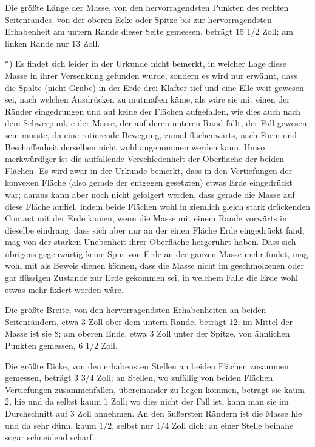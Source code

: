 \documentclass[a4paper, 11pt, oneside, german]{article}
\begin{document}
Die größte Länge der Masse, von den hervorragendsten Punkten des rechten Seitenrandes, von der oberen Ecke oder Spitze bis zur hervorragendsten Erhabenheit am untern Rande dieser Seite gemessen, beträgt 15 1/2 Zoll; am linken Rande nur 13 Zoll.

*) Es findet sich leider in der Urkunde nicht bemerkt, in welcher Lage diese Masse in ihrer Versenkung gefunden wurde, sondern es wird nur erwähnt, dass die Spalte (nicht Grube) in der Erde drei Klafter tief und eine Elle weit gewesen sei, nach welchen Ausdrücken zu mutmaßen käme, als wäre sie mit einen der Ränder eingedrungen und auf keine der Flächen aufgefallen, wie dies auch nach dem Schwerpunkte der Masse, der auf deren unteren Rand fällt, der Fall gewesen sein musste, da eine rotierende Bewegung, zumal flächenwärts, nach Form und Beschaffenheit derselben nicht wohl angenommen werden kann. Umso merkwürdiger ist die auffallende Verschiedenheit der Oberflache der beiden Flächen. Es wird zwar in der Urkunde bemerkt, dass in den Vertiefungen der konvexen Fläche (also gerade der entgegen gesetzten) etwas Erde eingedrückt war; daraus kann aber noch nicht gefolgert werden, dass gerade die Masse auf diese Fläche auffiel, indem beide Flächen wohl in ziemlich gleich stark drückenden Contact mit der Erde kamen, wenn die Masse mit einem Rande vorwärts in dieselbe eindrang; dass sich aber nur an der einen Fläche Erde eingedrückt fand, mag von der starken Unebenheit ihrer Oberfläche hergerührt haben. Dass sich übrigens gegenwärtig keine Spur von Erde an der ganzen Masse mehr findet, mag wohl mit als Beweis dienen können, dass die Masse nicht im geschmolzenen oder gar flüssigen Zustande zur Erde gekommen sei, in welchem Falle die Erde wohl etwas mehr fixiert worden wäre.

Die größte Breite, von den hervorragendsten Erhabenheiten an beiden Seitenrändern, etwa 3 Zoll ober dem untern Rande, beträgt 12; im Mittel der Masse ist sie 8; am oberen Ende, etwa 3 Zoll unter der Spitze, von ähnlichen Punkten gemessen, 6 1/2 Zoll.

Die größte Dicke, von den erhabensten Stellen an beiden Flächen zusammen gemessen, beträgt 3 3/4 Zoll; an Stellen, wo zufällig von beiden Flächen Vertiefungen zusammenfallen, übereinander zu liegen kommen, beträgt sie kaum 2, hie und da selbst kaum 1 Zoll; wo dies nicht der Fall ist, kann man sie im Durchschnitt auf 3 Zoll annehmen. An den äußersten Rändern ist die Masse hie und da sehr dünn, kaum 1/2, selbst nur 1/4 Zoll dick; an einer Stelle beinahe sogar schneidend scharf.
\end{document}
